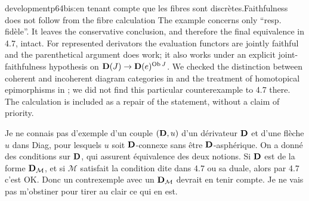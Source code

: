 \begin{dcomment}{development}{p64bis:en tenant compte que les fibres sont discrètes.}{Faithfulness does not follow from the fibre calculation}
The example concerns only ``resp. fidèle''. It leaves the conservative conclusion, and therefore the final equivalence in 4.7, intact. For represented derivators the evaluation functors are jointly faithful and the parenthetical argument does work; it also works under an explicit joint-faithfulness hypothesis on $\mathbf{D}(J)\to\mathbf{D}(e)^{\operatorname{Ob}J}$. We checked the distinction between coherent and incoherent diagram categories in \citet[Introduction and Definition 1.5]{Groth2013} and the treatment of homotopical epimorphisms in \citet[\S6]{GrothStovicek2016Trees}; we did not find this particular counterexample to 4.7 there. The calculation is included as a repair of the statement, without a claim of priority.
\end{dcomment}


Je ne connais pas d'exemple d'un couple $(\mathbf{D}, u)$ d'un dérivateur $\mathbf{D}$ et d'une flèche $u$ dans Diag, pour lesquels $u$ soit $\mathbf{D}$-connexe sans être $\mathbf{D}$-asphérique. On a donné des conditions sur $\mathbf{D}$, qui assurent équivalence des deux notions. Si $\mathbf{D}$ est de la forme $\mathbf{D}_{\mathcal{M}}$, et si $\mathcal{M}$ satisfait la condition dite dans 4.7 ou sa duale, alors par 4.7 c'est OK. Donc un contrexemple avec un $\mathbf{D}_{\mathcal{M}}$ devrait en tenir compte. Je ne vais pas m'obstiner pour tirer au clair ce qui en est.

